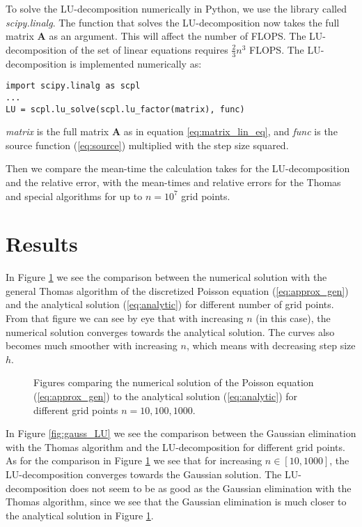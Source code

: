 \documentclass[12pt,a4paper,english]{article}
\begin{document}
To solve the LU-decomposition numerically in Python, we use the library called \textit{scipy.linalg}. The function that solves the LU-decomposition now takes the full matrix \textbf{A} as an argument. This will affect the number of FLOPS. The LU-decomposition of the set of linear equations requires $\frac{2}{3}n^3$ FLOPS. The LU-decomposition is implemented numerically as:
\begin{lstlisting}
import scipy.linalg as scpl
...
LU = scpl.lu_solve(scpl.lu_factor(matrix), func)
\end{lstlisting}
\textit{matrix} is the full matrix \textbf{A} as in equation \ref{eq:matrix_lin_eq}, and \textit{func} is the source function (\ref{eq:source}) multiplied with the step size squared.

Then we compare the mean-time the calculation takes for the LU-decomposition and the relative error, with the mean-times and relative errors for the Thomas and special algorithms for up to $n=10^7$ grid points.

\section{Results}
In Figure \ref{fig:gauss} we see the comparison between the numerical solution with the general Thomas algorithm of the discretized Poisson equation (\ref{eq:approx_gen}) and the analytical solution (\ref{eq:analytic}) for different number of grid points. From that figure we can see by eye that with increasing $n$ (in this case), the numerical solution converges towards the analytical solution. The curves also becomes much smoother with increasing $n$, which means with decreasing step size $h$.

\begin{figure}[htbp]
	\hspace*{-2.5cm}
	\subfloat[Comparison for $n=10$]{\texttt{[image: Gaussian\_n=10.png]}}
	\subfloat[Comparison for $n=100$]{\texttt{[image: Gaussian\_n=100.png]}}
	\subfloat[Comparison for $n=1000$]{\texttt{[image: Gaussian\_n=1000.png]}}
	\caption{Figures comparing the numerical solution of the Poisson equation (\ref{eq:approx_gen}) to the analytical solution (\ref{eq:analytic}) for different grid points $n=10, 100, 1000$.\label{fig:gauss}}
\end{figure}

In Figure \ref{fig:gauss_LU} we see the comparison between the Gaussian elimination with the Thomas algorithm and the LU-decomposition for different grid points. As for the comparison in Figure \ref{fig:gauss} we see that for increasing $n\in[10,1000]$, the LU-decomposition converges towards the Gaussian solution. The LU-decomposition does not seem to be as good as the Gaussian elimination with the Thomas algorithm, since we see that the Gaussian elimination is much closer to the analytical solution in Figure \ref{fig:gauss}. 
\end{document}
